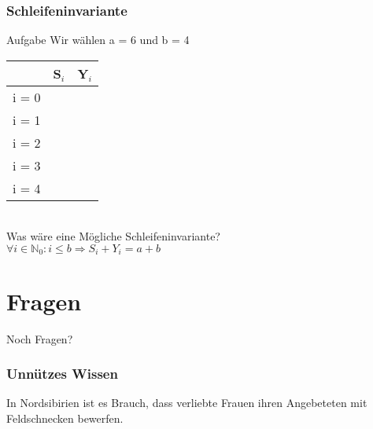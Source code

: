 \documentclass{beamer}
\newcommand{\tief}[1]{\ensuremath{\mathrm{#1}}}
\begin{document}
\begin{frame}
	\frametitle{Schleifeninvariante}
	\begin{block}{Aufgabe}
		Wir wählen a = 6 und b = 4 \bigskip \\
		\begin{tabular}[c]{| c | c | c |}
			\hline
			& S$_i$ & Y$_i$ \\
			\hline
			\hline
			i = 0 & & \\
			\hline
			i = 1 & & \\
			\hline
			i = 2 & & \\
			\hline
			i = 3 & & \\
			\hline
			i = 4 & & \\
			\hline
		\end{tabular}
		\bigskip \\
		Was wäre eine Mögliche Schleifeninvariante?\\
		\pause
		$\forall i \in \tief{\mathbb{N}_0}: i \leq b \Rightarrow S_i 			+ Y_i = a + b$
	\end{block}
\end{frame}

\section{Fragen}
\begin{frame}
	\begin{center}
		Noch Fragen?
	\end{center}
\end{frame}

\begin{frame}
	\frametitle{Unnützes Wissen}
	\begin{center}
		In Nordsibirien ist es Brauch, dass verliebte Frauen ihren 				Angebeteten mit Feldschnecken bewerfen.
	\end{center}
\end{frame}
\end{document}
